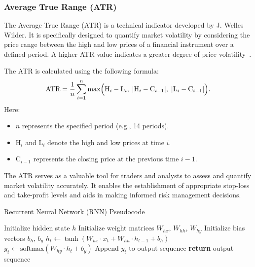 \documentclass[10pt,twocolumn,letterpaper]{article}
\begin{document}
\subsubsection{Average True Range (ATR)}

The Average True Range (ATR) is a technical indicator developed by J. Welles Wilder. It is specifically designed to quantify market volatility by considering the price range between the high and low prices of a financial instrument over a defined period. A higher ATR value indicates a greater degree of price volatility~\cite{RumelhartHintonWilliams}.

The ATR is calculated using the following formula:
\begin{equation}
   \text{ATR} =  \frac{1}{n} \sum_{i=1}^{n} \max\Bigl(\text{H}_i - \text{L}_i, \; |\text{H}_i - \text{C}_{i-1}|, \; |\text{L}_i - \text{C}_{i-1}|\Bigr).
\end{equation}
Here:
\begin{itemize}
   \item \(n\) represents the specified period (e.g., 14 periods).
   \item \(\text{H}_i\) and \(\text{L}_i\) denote the high and low prices at time \(i\).
   \item \(\text{C}_{i-1}\) represents the closing price at the previous time \(i-1\).
\end{itemize}

The ATR serves as a valuable tool for traders and analysts to assess and quantify market volatility accurately. It enables the establishment of appropriate stop-loss and take-profit levels and aids in making informed risk management decisions.

\begin{algorithm*}
   \caption{Recurrent Neural Network (RNN) Pseudocode}
   \begin{algorithmic}[1] %
      \State Initialize hidden state $h$
      \State Initialize weight matrices $W_{hx}$, $W_{hh}$, $W_{hy}$
      \State Initialize bias vectors $b_h$, $b_y$
      \State $h_t \gets \tanh(W_{hx} \cdot x_t + W_{hh} \cdot h_{t-1} + b_h)$ 
      \State $y_t \gets \text{softmax}(W_{hy} \cdot h_t + b_y)$ 
      \State Append $y_t$ to output sequence
      \EndFor
      \State \textbf{return} output sequence
      \EndProcedure
   \end{algorithmic}
\end{algorithm*}
\end{document}
